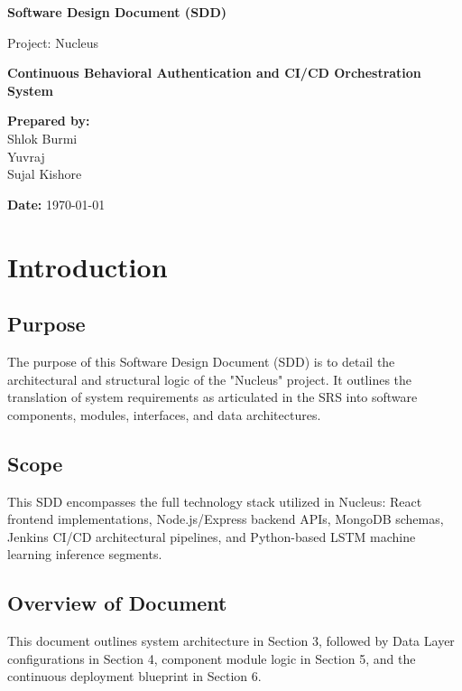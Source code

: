 \documentclass[12pt, a4paper]{article}
\begin{document}
\begin{titlepage}
    \centering
    \vspace*{2cm}
    
    \Huge
    \textbf{Software Design Document (SDD)}
    
    \vspace{0.5cm}
    \LARGE
    Project: Nucleus
    
    \vspace{1.5cm}
    
    \textbf{Continuous Behavioral Authentication and CI/CD Orchestration System}
    
    \vspace{2cm}
    
    \Large
    \textbf{Prepared by:} \\
    Shlok Burmi \\
    Yuvraj \\
    Sujal Kishore \\
    
    \vfill
    
    \Large
    \textbf{Date:} \today \\
    
\end{titlepage}

\tableofcontents
\newpage
\listoffigures
\newpage
\listoftables
\newpage

\section{Introduction}
\subsection{Purpose}
The purpose of this Software Design Document (SDD) is to detail the architectural and structural logic of the "Nucleus" project. It outlines the translation of system requirements as articulated in the SRS into software components, modules, interfaces, and data architectures. 

\subsection{Scope}
This SDD encompasses the full technology stack utilized in Nucleus: React frontend implementations, Node.js/Express backend APIs, MongoDB schemas, Jenkins CI/CD architectural pipelines, and Python-based LSTM machine learning inference segments.

\subsection{Overview of Document}
This document outlines system architecture in Section 3, followed by Data Layer configurations in Section 4, component module logic in Section 5, and the continuous deployment blueprint in Section 6.
\end{document}
